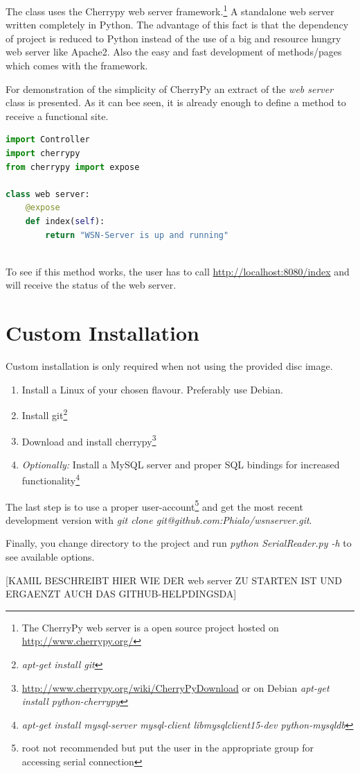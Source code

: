 The class uses the Cherrypy web server framework.\footnote{The CherryPy web server is a open source project hosted on \url{http://www.cherrypy.org/}} A standalone web server written completely in Python. The advantage of this fact is that the dependency of project is reduced to Python instead of the use of a big and resource hungry web server like Apache2. Also the easy and fast development of methods/pages which comes with the framework.

For demonstration of the simplicity of CherryPy an extract of the \textit{web server} class is presented. As it can bee seen, it is already enough to define a method to receive a functional site. 
\begin{lstlisting}[language=Python]
import Controller
import cherrypy
from cherrypy import expose

class web server:
    @expose
    def index(self):
        return "WSN-Server is up and running"
       
\end{lstlisting}

To see if this method works, the user has to call \url{http://localhost:8080/index} and will receive the status of the web server.


\section{Custom Installation}
\label{sec:install}

Custom installation is only required when not using the provided disc image.

\begin{enumerate}
    \item Install a Linux of your chosen flavour. Preferably use Debian.
    \item Install git\footnote{\textit{apt-get install git}}
    \item Download and install cherrypy\footnote{\url{http://www.cherrypy.org/wiki/CherryPyDownload} or on Debian \textit{apt-get install python-cherrypy}}
    \item \textit{Optionally:} Install a MySQL server and proper SQL bindings for increased functionality\footnote{\textit{apt-get install mysql-server mysql-client libmysqlclient15-dev python-mysqldb}}
\end{enumerate}

The last step is to use a proper user-account\footnote{root not recommended but put the user in the appropriate group for accessing serial connection} and
get the most recent development version with \textit{git clone git@github.com:Phialo/wsnserver.git}.

Finally, you change directory to the project and run \textit{python SerialReader.py -h} to see available options.

[KAMIL BESCHREIBT HIER WIE DER web server ZU STARTEN IST UND ERGAENZT AUCH DAS GITHUB-HELPDINGSDA]
